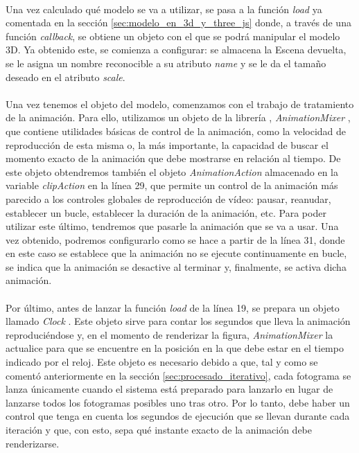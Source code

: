 \documentclass{subfiles}
\begin{document}
        \paragraph{}
        Una vez calculado qué modelo se va a utilizar, se pasa a la función \textit{load} ya comentada en la sección \ref{sec:modelo_en_3d_y_three_js} donde, a través de una función \textit{callback}, se obtiene un objeto con el que se podrá manipular el modelo 3D. Ya obtenido este, se comienza a configurar: se almacena la Escena devuelta, se le asigna un nombre reconocible a su atributo \textit{name} y se le da el tamaño deseado en el atributo \textit{scale}.

        \paragraph{}
        Una vez tenemos el objeto del modelo, comenzamos con el trabajo de tratamiento de la animación. Para ello, utilizamos un objeto de la librería \threejs, \textit{AnimationMixer} \cite{web:threejs_animationmixer}, que contiene utilidades básicas de control de la animación, como la velocidad de reproducción de esta misma o, la más importante, la capacidad de buscar el momento exacto de la animación que debe mostrarse en relación al tiempo. De este objeto obtendremos también el objeto \textit{AnimationAction} \cite{web:threejs_animationaction} almacenado en la variable \textit{clipAction} en la línea 29, que permite un control de la animación más parecido a los controles globales de reproducción de vídeo: pausar, reanudar, establecer un bucle, establecer la duración de la animación, etc. Para poder utilizar este último, tendremos que pasarle la animación que se va a usar. Una vez obtenido, podremos configurarlo como se hace a partir de la línea 31, donde en este caso se establece que la animación no se ejecute continuamente en bucle, se indica que la animación se desactive al terminar y, finalmente, se activa dicha animación.

        \paragraph{}
        Por último, antes de lanzar la función \textit{load} de la línea 19, se prepara un objeto llamado \textit{Clock} \cite{web:threejs_clock}. Este objeto sirve para contar los segundos que lleva la animación reproduciéndose y, en el momento de renderizar la figura, \textit{AnimationMixer} la actualice para que se encuentre en la posición en la que debe estar en el tiempo indicado por el reloj. Este objeto es necesario debido a que, tal y como se comentó anteriormente en la sección \ref{sec:procesado_iterativo}, cada fotograma se lanza únicamente cuando el sistema está preparado para lanzarlo en lugar de lanzarse todos los fotogramas posibles uno tras otro. Por lo tanto, debe haber un control que tenga en cuenta los segundos de ejecución que se llevan durante cada iteración y que, con esto, sepa qué instante exacto de la animación debe renderizarse.
\end{document}

